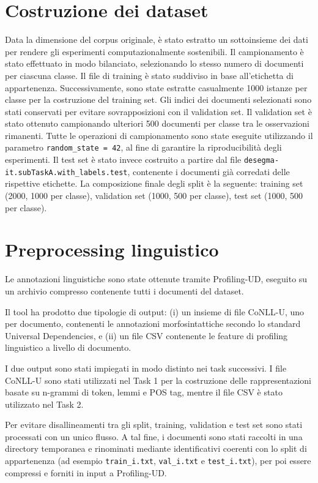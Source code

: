 \documentclass{article}
\begin{document}
\section{Costruzione dei dataset} Data la dimensione del corpus originale, è stato estratto un sottoinsieme dei dati per rendere gli esperimenti computazionalmente sostenibili. Il campionamento è stato effettuato in modo bilanciato, selezionando lo stesso numero di documenti per ciascuna classe. Il file di training è stato suddiviso in base all’etichetta di appartenenza. Successivamente, sono state estratte casualmente 1000 istanze per classe per la costruzione del training set. Gli indici dei documenti selezionati sono stati conservati per evitare sovrapposizioni con il validation set. Il validation set è stato ottenuto campionando ulteriori 500 documenti per classe tra le osservazioni rimanenti. Tutte le operazioni di campionamento sono state eseguite utilizzando il parametro \texttt{random\_state = 42}, al fine di garantire la riproducibilità degli esperimenti. Il test set è stato invece costruito a partire dal file \texttt{desegma-it.subTaskA.with\_labels.test}, contenente i documenti già corredati delle rispettive etichette. La composizione finale degli split è la seguente: training set (2000, 1000 per classe), validation set (1000, 500 per classe), test set (1000, 500 per classe).

\section{Preprocessing linguistico}
\label{sec:preprocessing}

Le annotazioni linguistiche sono state ottenute tramite Profiling-UD, eseguito su un archivio compresso contenente tutti i documenti del dataset.

Il tool ha prodotto due tipologie di output: (i) un insieme di file CoNLL-U, uno per documento, contenenti le annotazioni morfosintattiche secondo lo standard Universal Dependencies, e (ii) un file CSV contenente le feature di profiling linguistico a livello di documento.

I due output sono stati impiegati in modo distinto nei task successivi. I file CoNLL-U sono stati utilizzati nel Task 1 per la costruzione delle rappresentazioni basate su n-grammi di token, lemmi e POS tag, mentre il file CSV è stato utilizzato nel Task 2.

Per evitare disallineamenti tra gli split, training, validation e test set sono stati processati con un unico flusso. A tal fine, i documenti sono stati raccolti in una directory temporanea e rinominati mediante identificativi coerenti con lo split di appartenenza (ad esempio \texttt{train\_i.txt}, \texttt{val\_i.txt} e \texttt{test\_i.txt}), per poi essere compressi e forniti in input a Profiling-UD.
\end{document}
